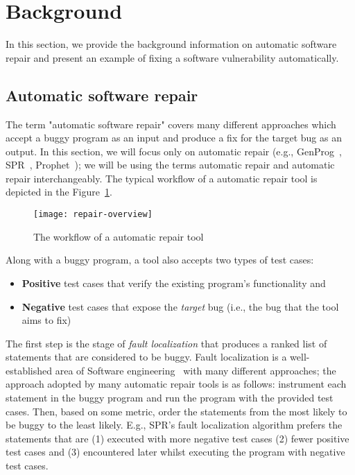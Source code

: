\section{Background}
\label{section:background}

In this section, we provide the background information on automatic software repair and present an example of fixing a software vulnerability automatically.

\subsection{Automatic software repair}

The term "automatic software repair" covers many different approaches which accept a buggy program as an input and produce a fix for the target bug as an output.
In this section, we will focus only on \GV automatic repair (e.g., GenProg~\cite{le2012systematic}, SPR~\cite{long2015staged}, Prophet~\cite{long2015prophet}); we will be using the terms \GV automatic repair and automatic repair interchangeably.
The typical workflow of a \GV automatic repair tool is depicted in the Figure~\ref{figure:repair-overview}.

\begin{figure}
    \texttt{[image: repair-overview]}
    \caption{The workflow of a \GV automatic repair tool}
    \label{figure:repair-overview}
\end{figure}

Along with a buggy program, a \GV tool also accepts two types of test cases:
\begin{itemize}
    \item \textbf{Positive} test cases that verify the existing program's functionality and
    \item \textbf{Negative} test cases that expose the \emph{target} bug (i.e., the bug that the tool aims to fix)
\end{itemize}

The first step is the stage of \emph{fault localization} that produces a ranked list of statements that are considered to be buggy. Fault localization is a well-established area of Software engineering~\cite{XXX} with many different approaches; the approach adopted by many automatic repair tools is as follows: instrument each statement in the buggy program and run the program with the provided test cases. Then, based on some metric, order the statements from the most likely to be buggy to the least likely. E.g., SPR's fault localization algorithm prefers the statements that are (1) executed with more negative test cases (2) fewer positive test cases and (3) encountered later whilst executing the program with negative test cases.

